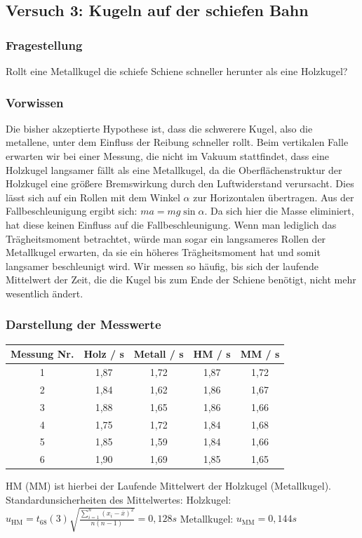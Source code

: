 \documentclass[
	a4paper,
	12pt,
	pagesize,
	ngerman
]{scrartcl}
\begin{document}
	\subsection{Versuch 3: Kugeln auf der schiefen Bahn}
	\subsubsection{Fragestellung}
	Rollt eine Metallkugel die schiefe Schiene schneller herunter als eine Holzkugel?
	\subsubsection{Vorwissen}
	Die bisher akzeptierte Hypothese ist, dass die schwerere Kugel, also die metallene, unter dem Einfluss der Reibung schneller rollt. Beim vertikalen Falle erwarten wir bei einer Messung, die nicht im Vakuum stattfindet, dass eine Holzkugel langsamer fällt als eine Metallkugel, da die Oberflächenstruktur der Holzkugel eine größere Bremswirkung durch den Luftwiderstand verursacht. Dies lässt sich auf ein Rollen mit dem Winkel $\alpha$ zur Horizontalen übertragen. Aus der Fallbeschleunigung ergibt sich: 
	$ma=mg \sin \alpha$.
	Da sich hier die Masse eliminiert, hat diese keinen Einfluss auf die Fallbeschleunigung. Wenn man lediglich das Trägheitsmoment betrachtet, würde man sogar ein langsameres Rollen der Metallkugel erwarten, da sie ein höheres Trägheitsmoment hat und somit langsamer beschleunigt wird.
	Wir messen so häufig, bis sich der laufende Mittelwert der Zeit, die die Kugel bis zum Ende der Schiene benötigt, nicht mehr wesentlich ändert.
	\subsubsection{Darstellung der Messwerte}
	
	\begin{tabular}{| c | c | c | c | c |} \hline
		Messung Nr. & Holz  / \si{s} & Metall  / \si{s} & HM  / \si{s} & MM  / \si{s}\\ \hline
		1 & 1,87&1,72&1,87&1,72\\
		2 & 1,84&1,62&1,86&1,67\\
		3 & 1,88&1,65&1,86&1,66\\
		4 & 1,75&1,72&1,84&1,68\\
		5 & 1,85&1,59&1,84&1,66\\
		6 & 1,90&1,69&1,85&1,65\\
		\hline
	\end{tabular}
	\newline
	HM (MM) ist hierbei der Laufende Mittelwert der Holzkugel (Metallkugel). \newline
	Standardunsicherheiten des Mittelwertes: \newline
	Holzkugel: $u_\text{HM}=t_{68}(3)\sqrt{\frac{\sum_{i=1}^{n} (x_i-\overline{x})^2}{n(n-1)}}=0,128 \si{s}$ \newline
	Metallkugel: $u_\text{MM}=0,144\si{s}$
	
\end{document}
